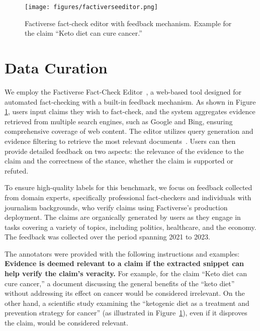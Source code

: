 \begin{figure}
    \centering
    \texttt{[image: figures/factiverseeditor.png]}
    \caption{Factiverse fact-check editor with feedback mechanism. Example for the claim ``Keto diet can cure cancer.''}
    \label{fig:fceditor}
    \vspace{-10pt}
\end{figure}

\section{Data Curation}
We employ the Factiverse Fact-Check Editor~\cite{10.1145/3626772.3657663}, a web-based tool designed for automated fact-checking with a built-in feedback mechanism. As shown in Figure \ref{fig:fceditor}, users input claims they wish to fact-check, and the system aggregates evidence retrieved from multiple search engines, such as Google and Bing, ensuring comprehensive coverage of web content. The editor utilizes query generation and evidence filtering to retrieve the most relevant documents~\cite{10.1145/3626772.3661361,10.1145/3627673.3679985}. Users can then provide detailed feedback on two aspects: the relevance of the evidence to the claim and the correctness of the stance, whether the claim is supported or refuted.

To ensure high-quality labels for this benchmark, we focus on feedback collected from domain experts, specifically professional fact-checkers and individuals with journalism backgrounds, who verify claims using Factiverse’s production deployment. The claims are organically generated by users as they engage in tasks covering a variety of topics, including politics, healthcare, and the economy. The feedback was collected over the period spanning 2021 to 2023.

The annotators were provided with the following instructions and examples: \textbf{Evidence is deemed relevant to a claim if the extracted snippet can help verify the claim’s veracity.} For example, for the claim ``Keto diet can cure cancer,'' a document discussing the general benefits of the ``keto diet'' without addressing its effect on cancer would be considered irrelevant. On the other hand, a scientific study examining the ``ketogenic diet as a treatment and prevention strategy for cancer'' (as illustrated in Figure~\ref{fig:fceditor}), even if it disproves the claim, would be considered relevant.

